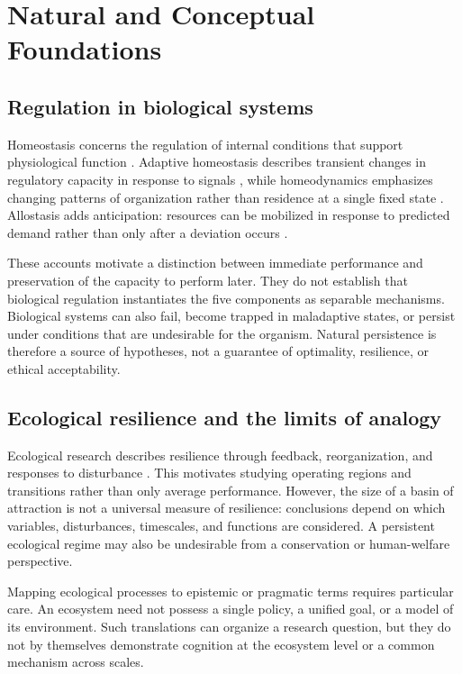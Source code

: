 \section{Natural and Conceptual Foundations}
\label{sec:foundations}

\subsection{Regulation in biological systems}
Homeostasis concerns the regulation of internal conditions that support physiological function \citep{billman2020homeostasis}. Adaptive homeostasis describes transient changes in regulatory capacity in response to signals \citep{davies2016adaptive}, while homeodynamics emphasizes changing patterns of organization rather than residence at a single fixed state \citep{lloyd2001homeodynamics}. Allostasis adds anticipation: resources can be mobilized in response to predicted demand rather than only after a deviation occurs \citep{schulkin2019allostasis}.

These accounts motivate a distinction between immediate performance and preservation of the capacity to perform later. They do not establish that biological regulation instantiates the five \uvif{} components as separable mechanisms. Biological systems can also fail, become trapped in maladaptive states, or persist under conditions that are undesirable for the organism. Natural persistence is therefore a source of hypotheses, not a guarantee of optimality, resilience, or ethical acceptability.

\subsection{Ecological resilience and the limits of analogy}
Ecological research describes resilience through feedback, reorganization, and responses to disturbance \citep{folke2006resilience,levin1998ecosystems}. This motivates studying operating regions and transitions rather than only average performance. However, the size of a basin of attraction is not a universal measure of resilience: conclusions depend on which variables, disturbances, timescales, and functions are considered. A persistent ecological regime may also be undesirable from a conservation or human-welfare perspective.

Mapping ecological processes to epistemic or pragmatic terms requires particular care. An ecosystem need not possess a single policy, a unified goal, or a model of its environment. Such translations can organize a research question, but they do not by themselves demonstrate cognition at the ecosystem level or a common mechanism across scales.

